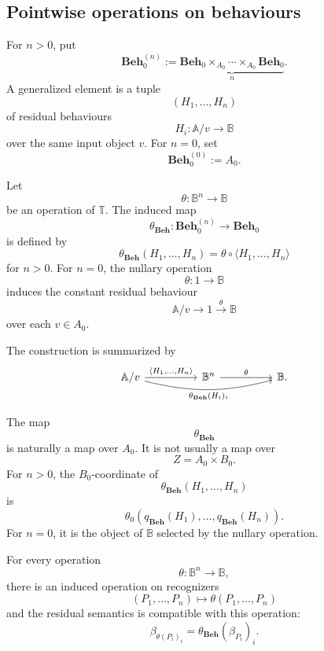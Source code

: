 \subsection{Pointwise operations on behaviours}
\label{subsec:pointwise-operations-behaviours}

For \(n>0\), put
\[
    \mathbf{Beh}_0^{(n)}
    :=
    \underbrace{
    \mathbf{Beh}_0\times_{A_0}\cdots\times_{A_0}\mathbf{Beh}_0
    }_{n}.
\]
A generalized element is a tuple
\[
    (H_1,\dots,H_n)
\]
of residual behaviours
\[
    H_i:\mathbb A/v\to\mathbb B
\]
over the same input object \(v\). For \(n=0\), set
\[
    \mathbf{Beh}_0^{(0)}:=A_0.
\]

\begin{definition}
\label{def:pointwise-structured-behaviour}
    Let
    \[
        \theta:\mathbb B^n\to\mathbb B
    \]
    be an operation of \(\mathbb T\). The induced map
    \[
        \theta_{\mathbf{Beh}}:
        \mathbf{Beh}_0^{(n)}\to\mathbf{Beh}_0
    \]
    is defined by
    \[
        \theta_{\mathbf{Beh}}(H_1,\dots,H_n)
        =
        \theta\circ\langle H_1,\dots,H_n\rangle
    \]
    for \(n>0\). For \(n=0\), the nullary operation
    \[
        \theta:1\to\mathbb B
    \]
    induces the constant residual behaviour
    \[
        \mathbb A/v\to 1\xrightarrow{\theta}\mathbb B
    \]
    over each \(v\in A_0\).
\end{definition}

The construction is summarized by
\[
\begin{tikzcd}[column sep=huge, row sep=large]
    \mathbb A/v
        \arrow[r, "{\langle H_1,\dots,H_n\rangle}"]
        \arrow[rr, "{\theta_{\mathbf{Beh}}(H_i)_i}"', bend right=14]
    &
    \mathbb B^n
        \arrow[r, "\theta"]
    &
    \mathbb B .
\end{tikzcd}
\]

The map
\[
    \theta_{\mathbf{Beh}}
\]
is naturally a map over \(A_0\). It is not usually a map over
\[
    Z=A_0\times B_0.
\]
For \(n>0\), the \(B_0\)-coordinate of
\[
    \theta_{\mathbf{Beh}}(H_1,\dots,H_n)
\]
is
\[
    \theta_0(q_{\mathbf{Beh}}(H_1),\dots,q_{\mathbf{Beh}}(H_n)).
\]
For \(n=0\), it is the object of \(\mathbb B\) selected by the nullary
operation.

\begin{lemma}
\label{lem:structured-operations-semantic}
    For every operation
    \[
        \theta:\mathbb B^n\to\mathbb B,
    \]
    there is an induced operation on recognizers
    \[
        (P_1,\dots,P_n)
        \longmapsto
        \theta(P_1,\dots,P_n)
    \]
    and the residual semantics is compatible with this operation:
    \[
        \beta_{\theta(P_i)_i}
        =
        \theta_{\mathbf{Beh}}(\beta_{P_i})_i.
    \]
\end{lemma}


